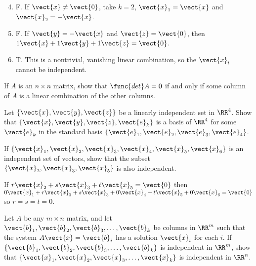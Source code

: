 \begin{multicols}{2}
\begin{ex}
\begin{sol}
\begin{enumerate}[label={\alph*.}]
\setcounter{enumi}{3}
\item  F. If $\vect{x} \neq \vect{0}$, take $k = 2$, $\vect{x}_{1} = \vect{x}$ and $\vect{x}_{2} = -\vect{x}$.

\setcounter{enumi}{5}
\item  F. If $\vect{y} = -\vect{x}$ and $\vect{z} = \vect{0}$, then $1\vect{x} + 1\vect{y} + 1\vect{z} = \vect{0}$.

\setcounter{enumi}{7}
\item  T. This is a nontrivial, vanishing linear combination, so the $\vect{x}_{i}$ cannot be independent.

\end{enumerate}
\end{sol}
\end{ex}

\begin{ex}
If $A$ is an $n \times n$ matrix, show that $\func{det} A = 0$ if and only if some column of $A$ is a linear combination of the other columns.
\end{ex}

\begin{ex}
Let $\{\vect{x}, \vect{y}, \vect{z}\}$ be a linearly independent set in $\RR^4$. Show that $\{\vect{x}, \vect{y}, \vect{z}, \vect{e}_{k}\}$ is a basis of $\RR^4$ for some $\vect{e}_{k}$ in the standard basis $\{\vect{e}_{1}, \vect{e}_{2}, \vect{e}_{3}, \vect{e}_{4}\}$.
\end{ex}

\begin{ex}
If $\{\vect{x}_{1}, \vect{x}_{2}, \vect{x}_{3}, \vect{x}_{4}, \vect{x}_{5}, \vect{x}_{6}\}$ is an independent set of vectors, show that the subset $\{\vect{x}_{2}, \vect{x}_{3}, \vect{x}_{5}\}$ is also independent.

\begin{sol}
If $r\vect{x}_{2} + s\vect{x}_{3} + t\vect{x}_{5} = \vect{0}$ then $0\vect{x}_{1} + r\vect{x}_{2} + s\vect{x}_{3} + 0\vect{x}_{4} + t\vect{x}_{5} + 0\vect{x}_{6} = \vect{0}$ so $r = s = t = 0$.
\end{sol}
\end{ex}

\begin{ex}
Let $A$ be any $m \times n$ matrix, and let $\vect{b}_{1}, \vect{b}_{2}, \vect{b}_{3}, \dots, \vect{b}_{k}$ be columns in $\RR^m$ such that the system $A\vect{x} = \vect{b}_{i}$ has a solution $\vect{x}_{i}$ for each $i$. If $\{\vect{b}_{1}, \vect{b}_{2}, \vect{b}_{3}, \dots, \vect{b}_{k}\}$ is independent in $\RR^m$, show that $\{\vect{x}_{1}, \vect{x}_{2}, \vect{x}_{3}, \dots, \vect{x}_{k}\}$ is independent in $\RR^n$.
\end{ex}


\end{multicols}
